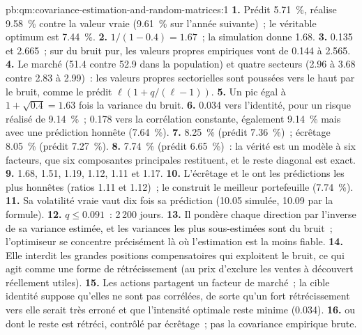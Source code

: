 \begin{solution}{pb:qm:covariance-estimation-and-random-matrices:1}
\textbf{1.} Prédit 5.71~\%, réalise 9.58~\% contre la valeur vraie (9.61~\% sur l'année suivante)~; le véritable optimum est 7.44~\%.
\textbf{2.} $1/(1 - 0.4) = 1.67$~; la simulation donne 1.68.
\textbf{3.} 0.135 et 2.665~; sur du bruit pur, les valeurs propres empiriques vont de 0.144 à 2.565.
\textbf{4.} Le marché (51.4 contre 52.9 dans la population) et quatre secteurs (2.96 à 3.68 contre 2.83 à 2.99)~: les valeurs propres sectorielles sont poussées vers le haut par le bruit, comme
le prédit $\ell(1 + q/(\ell - 1))$.
\textbf{5.} Un pic égal à $1 + \sqrt{0.4} = 1.63$ fois la variance du bruit.
\textbf{6.} 0.034 vers l'identité, pour un risque réalisé de 9.14~\%~; 0.178 vers la corrélation constante, également 9.14~\% mais avec une prédiction honnête (7.64~\%).
\textbf{7.}  8.25~\% (prédit 7.36~\%)~; écrêtage 8.05~\% (prédit 7.27~\%).
\textbf{8.} 7.74~\% (prédit 6.65~\%)~: la vérité est un modèle à six facteurs, que six composantes principales restituent, et le reste diagonal est exact.
\textbf{9.} 1.68, 1.51, 1.19, 1.12, 1.11 et 1.17.
\textbf{10.} L'écrêtage et le  ont les prédictions les plus honnêtes (ratios 1.11 et 1.12)~; le  construit le meilleur portefeuille (7.74~\%).
\textbf{11.} Sa volatilité vraie vaut dix fois sa prédiction (10.05 simulée, 10.09 par la formule).
\textbf{12.} $q \le 0.091$~: 2\,200 jours.
\textbf{13.} Il pondère chaque direction par l'inverse de sa variance estimée, et les variances les plus sous-estimées sont du bruit~; l'optimiseur se concentre précisément là où l'estimation est
la moins fiable.
\textbf{14.} Elle interdit les grandes positions compensatoires qui exploitent le bruit, ce qui agit comme une forme de rétrécissement (au prix d'exclure les ventes à découvert réellement utiles).
\textbf{15.} Les actions partagent un facteur de marché~; la cible identité suppose qu'elles ne sont pas corrélées, de sorte qu'un fort rétrécissement vers elle serait très erroné et que l'intensité optimale reste minime (0.034).
\textbf{16.}  ou  dont le reste est rétréci, contrôlé par écrêtage~; pas la covariance empirique brute.

\end{solution}

